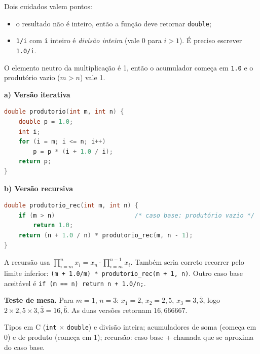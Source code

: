 \documentclass[11pt,a4paper]{article}
\newcommand{\solucao}{\par\medskip\noindent{\large\bfseries\color{verde}Solução}\par\smallskip}
\begin{document}
\solucao
Dois cuidados valem pontos:
\begin{itemize}
  \item o resultado não é inteiro, então a função deve retornar \texttt{double};
  \item \texttt{1/i} com \texttt{i} inteiro é \emph{divisão inteira} (vale 0 para $i>1$). É preciso
  escrever \texttt{1.0/i}.
\end{itemize}
O elemento neutro da multiplicação é 1, então o acumulador começa em \texttt{1.0} e o produtório
vazio ($m>n$) vale 1.

\textbf{a) Versão iterativa}
\begin{lstlisting}[language=C]
double produtorio(int m, int n) {
    double p = 1.0;
    int i;
    for (i = m; i <= n; i++)
        p = p * (i + 1.0 / i);
    return p;
}
\end{lstlisting}

\textbf{b) Versão recursiva}
\begin{lstlisting}[language=C]
double produtorio_rec(int m, int n) {
    if (m > n)                      /* caso base: produtório vazio */
        return 1.0;
    return (n + 1.0 / n) * produtorio_rec(m, n - 1);
}
\end{lstlisting}
A recursão usa $\prod_{i=m}^{n} x_i = x_n \cdot \prod_{i=m}^{n-1} x_i$. Também seria correto
recorrer pelo limite inferior: \texttt{(m + 1.0/m) * produtorio\_rec(m + 1, n)}.
Outro caso base aceitável é \texttt{if (m == n) return n + 1.0/n;}.

\medskip
\textbf{Teste de mesa.} Para $m=1$, $n=3$: $x_1 = 2$, $x_2 = 2{,}5$, $x_3 = 3{,}\overline{3}$, logo
$2 \times 2{,}5 \times 3{,}\overline{3} = 16{,}\overline{6}$. As duas versões retornam $16{,}666667$.

\begin{dica}
Tipos em C (\texttt{int} $\times$ \texttt{double}) e divisão inteira; acumuladores de soma (começa em 0)
e de produto (começa em 1); recursão: caso base + chamada que se aproxima do caso base.
\end{dica}

\end{document}
